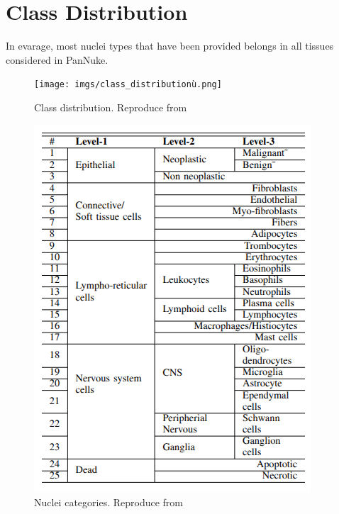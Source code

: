 \documentclass[target=bach,aauheader=,style=]{thud}
\begin{document}
\section{Class Distribution}
\label{sec:classdistribution}
In evarage, most nuclei types that have been provided belongs in all tissues considered in PanNuke.
\begin{figure}[h]
  \centering
  \begin{minipage}{0.45\textwidth}
    \centering
    \texttt{[image: imgs/class\_distributionù.png]}
    \caption{Class distribution. Reproduce from \cite{gamper2020pannuke}}
    \label{fig:class_distri}
  \end{minipage}\hspace{2cm}
  \begin{minipage}{0.3\textwidth}
    \centering
    \includegraphics[width=\linewidth]{imgs/class_tab.png}
    \caption{Nuclei categories. Reproduce from \cite{gamper2020pannuke}}
    \label{fig:class_tab}
  \end{minipage}
\end{figure}
\end{document}
